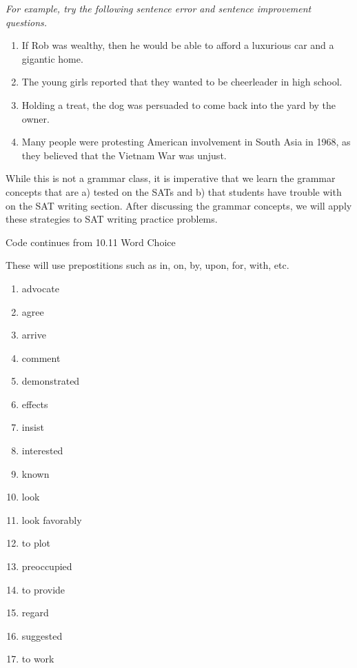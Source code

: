 \documentclass[12pt]{book}
\newcommand{\longline}{\underline{\hspace{2in}} }
\begin{document}

\textit{For example, try the following sentence error and sentence improvement questions.}

\begin{enumerate}
\item If Rob was wealthy, then he would be able to afford a luxurious car and a gigantic home. 
\item The young girls reported that they wanted to be cheerleader in high school. 
\item Holding a treat, the dog was persuaded to come back into the yard by the owner. 
\item Many people were protesting American involvement in South Asia in 1968, as they believed that the Vietnam War was unjust. 
\end{enumerate}

While this is not a grammar class, it is imperative that we learn the grammar concepts that are a) tested on the SATs and b) that students have trouble with on the SAT writing section. After discussing the grammar concepts, we will apply these strategies to SAT writing practice problems. 


Code continues from 10.11 Word Choice

These will use prepostitions such as in, on, by, upon, for, with, etc. 

\begin{enumerate}
\item advocate \longline
\item  agree \longline 
\item arrive \longline
\item comment \longline
\item demonstrated \longline
\item effects \longline
\item insist \longline
\item interested \longline
\item known \longline
\item look \longline
\item look favorably \longline
\item to plot \longline
\item preoccupied \longline
\item to provide \longline
\item regard \longline
\item suggested \longline 
\item to work \longline
\end{enumerate}
\end{document}
